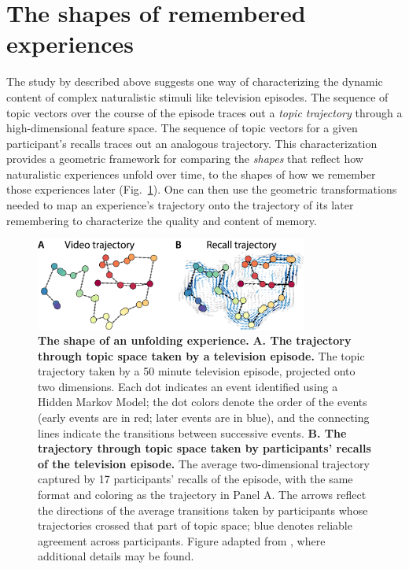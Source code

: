 \documentclass{article}
\begin{document}
\section*{The shapes of remembered experiences}
The study by \cite{HeusEtal18c} described above suggests one way of characterizing the dynamic content of complex naturalistic stimuli like television episodes.  The sequence of topic vectors over the course of the episode traces out a \textit{topic trajectory} through a high-dimensional feature space.  The sequence of topic vectors for a given participant's recalls traces out an analogous trajectory.  This characterization provides a geometric framework for comparing the \textit{shapes} that reflect how naturalistic experiences unfold over time, to the shapes of how we remember those experiences later (Fig.~\ref{fig:trajectories}).  One can then use the geometric transformations needed to map an experience's trajectory onto the trajectory of its later remembering to characterize the quality and content of memory.

\begin{figure}[tp]
\centering
\includegraphics[width=0.8\textwidth]{figs/trajectory.png}
\caption{\textbf{The shape of an unfolding experience.}  \textbf{A. The trajectory through topic space taken by a television episode.} The topic trajectory taken by a 50 minute television episode, projected onto two dimensions.  Each dot indicates an event identified using a Hidden Markov Model; the dot colors denote the order of the events (early events are in red; later events are in blue), and the connecting lines indicate the transitions between successive events.  \textbf{B. The trajectory through topic space taken by participants' recalls of the television episode.} The average two-dimensional trajectory captured by 17 participants' recalls of the episode, with the same format and coloring as the trajectory in Panel A. The arrows reflect the directions of the average transitions taken by participants whose trajectories crossed that part of topic space; blue denotes reliable agreement across participants.  Figure adapted from \cite{HeusEtal18c}, where additional details may be found.}
\label{fig:trajectories}
\end{figure}
\end{document}
